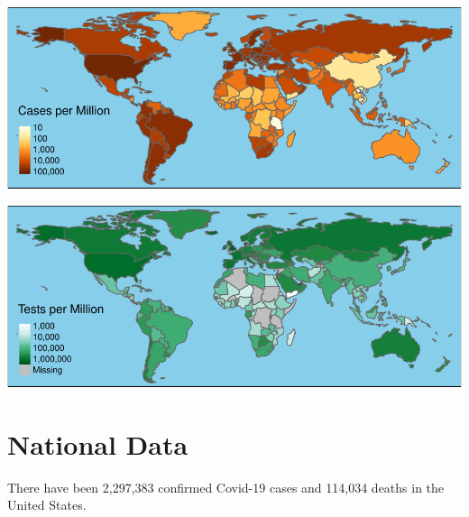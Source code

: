 \documentclass[]{article}
\begin{document}
\includegraphics{covid_files/figure-latex/unnamed-chunk-5-1.pdf}

\includegraphics{covid_files/figure-latex/unnamed-chunk-6-1.pdf}

\newpage

\hypertarget{national-data}{%
\section{National Data}\label{national-data}}

There have been 2,297,383 confirmed Covid-19 cases and 114,034 deaths in
the United States.
\end{document}
